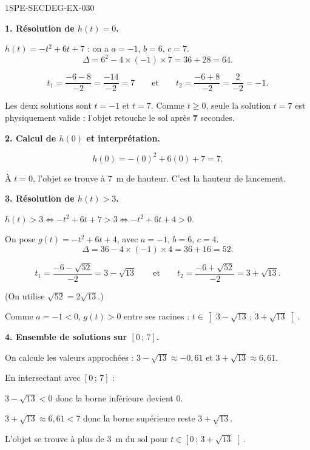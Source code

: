 \begin{corrige}{1SPE-SECDEG-EX-030}

\textbf{1. Résolution de $h(t) = 0$.}


$h(t) = -t^2 + 6t + 7$ : on a $a = -1$, $b = 6$, $c = 7$.
\[\Delta = 6^2 - 4 \times (-1) \times 7 = 36 + 28 = 64.\]

\[t_1 = \frac{-6 - 8}{-2} = \frac{-14}{-2} = 7 \qquad \text{et} \qquad t_2 = \frac{-6 + 8}{-2} = \frac{2}{-2} = -1.\]

Les deux solutions sont $t = -1$ et $t = 7$. Comme $t \geqslant 0$, seule la solution $t = 7$ est physiquement valide : l'objet retouche le sol après $\mathbf{7}$ secondes.

\medskip
\textbf{2. Calcul de $h(0)$ et interprétation.}


\[h(0) = -(0)^2 + 6(0) + 7 = 7.\]

À $t = 0$, l'objet se trouve à $7$~m de hauteur. C'est la hauteur de lancement.

\medskip
\textbf{3. Résolution de $h(t) > 3$.}


$h(t) > 3 \iff -t^2 + 6t + 7 > 3 \iff -t^2 + 6t + 4 > 0$.

On pose $g(t) = -t^2 + 6t + 4$, avec $a = -1$, $b = 6$, $c = 4$.
\[\Delta = 36 - 4 \times (-1) \times 4 = 36 + 16 = 52.\]

\[t_1 = \frac{-6 - \sqrt{52}}{-2} = 3 - \sqrt{13} \qquad \text{et} \qquad t_2 = \frac{-6 + \sqrt{52}}{-2} = 3 + \sqrt{13}.\]

(On utilise $\sqrt{52} = 2\sqrt{13}$.)

Comme $a = -1 < 0$, $g(t) > 0$ entre ses racines : $t \in \left]3 - \sqrt{13}\,;\,3 + \sqrt{13}\right[$.

\medskip
\textbf{4. Ensemble de solutions sur $[0\,;\,7]$.}


On calcule les valeurs approchées : $3 - \sqrt{13} \approx -0{,}61$ et $3 + \sqrt{13} \approx 6{,}61$.

En intersectant avec $[0\,;\,7]$ :

$3 - \sqrt{13} < 0$ donc la borne inférieure devient $0$.

$3 + \sqrt{13} \approx 6{,}61 < 7$ donc la borne supérieure reste $3 + \sqrt{13}$.

L'objet se trouve à plus de $3$~m du sol pour $t \in \left[0\,;\,3 + \sqrt{13}\right[$.

\end{corrige}
